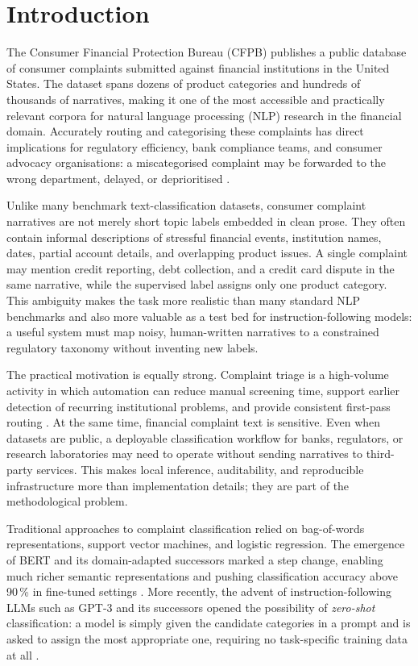 \documentclass[journal]{IEEEtran}
\begin{document}
\section{Introduction}
\label{sec:intro}

The Consumer Financial Protection Bureau (CFPB) publishes a public
database of consumer complaints submitted against financial institutions
in the United States. The dataset spans dozens of product categories
and hundreds of thousands of narratives, making it one of the most
accessible and practically relevant corpora for natural language
processing (NLP) research in the financial domain. Accurately routing
and categorising these complaints has direct implications for
regulatory efficiency, bank compliance teams, and consumer advocacy
organisations: a miscategorised complaint may be forwarded to the wrong
department, delayed, or deprioritised
\cite{das2024explainable,liu2024framework,jondhale2024cfpb}.

Unlike many benchmark text-classification datasets, consumer complaint
narratives are not merely short topic labels embedded in clean prose.
They often contain informal descriptions of stressful financial events,
institution names, dates, partial account details, and overlapping
product issues. A single complaint may mention credit reporting, debt
collection, and a credit card dispute in the same narrative, while the
supervised label assigns only one product category. This ambiguity makes
the task more realistic than many standard NLP benchmarks and also more
valuable as a test bed for instruction-following models: a useful system
must map noisy, human-written narratives to a constrained regulatory
taxonomy without inventing new labels.

The practical motivation is equally strong. Complaint triage is a
high-volume activity in which automation can reduce manual screening
time, support earlier detection of recurring institutional problems,
and provide consistent first-pass routing \cite{di2023complaint}.
At the same time, financial
complaint text is sensitive. Even when datasets are public, a deployable
classification workflow for banks, regulators, or research laboratories
may need to operate without sending narratives to third-party services.
This makes local inference, auditability, and reproducible infrastructure
more than implementation details; they are part of the methodological
problem.

Traditional approaches to complaint classification relied on
bag-of-words representations, support vector machines, and logistic
regression. The emergence of BERT \cite{devlin2019bert} and its
domain-adapted successors marked a step change, enabling much richer
semantic representations and pushing classification accuracy above
90\,\% in fine-tuned settings \cite{vairetti2024bert}. More recently,
the advent of instruction-following LLMs such as GPT-3 \cite{brown2020gpt3}
and its successors opened the possibility of \emph{zero-shot}
classification: a model is simply given the candidate categories in
a prompt and is asked to assign the most appropriate one, requiring
no task-specific training data at all
\cite{kojima2022zeroshotcot,madanchian2024genai}.
\end{document}
